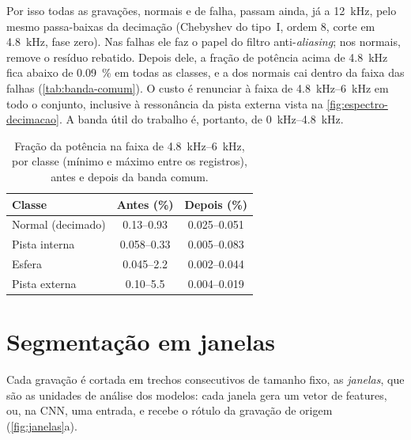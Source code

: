 Por isso todas as gravações, normais e de falha, passam ainda, já a
\SI{12}{\kilo\hertz}, pelo mesmo passa-baixas da decimação (Chebyshev do tipo~I,
ordem 8, corte em \SI{4.8}{\kilo\hertz}, fase zero). Nas falhas ele faz o papel
do filtro anti-\emph{aliasing}; nos normais, remove o resíduo rebatido. Depois
dele, a fração de potência acima de \SI{4.8}{\kilo\hertz} fica abaixo de
\SI{0.09}{\percent} em todas as classes, e a dos normais cai dentro da faixa das
falhas (\autoref{tab:banda-comum}). O custo é renunciar à faixa de
\SIrange{4.8}{6}{\kilo\hertz} em todo o conjunto, inclusive à ressonância da
pista externa vista na \autoref{fig:espectro-decimacao}. A banda útil do
trabalho é, portanto, de \SIrange{0}{4.8}{\kilo\hertz}.

\begin{table}[htb]
  \centering
  \caption{Fração da potência na faixa de \SIrange{4.8}{6}{\kilo\hertz}, por
  classe (mínimo e máximo entre os registros), antes e depois da banda comum.}
  \label{tab:banda-comum}
  \begin{tabular}{lcc}
    \toprule
    \textbf{Classe} & \textbf{Antes (\%)} & \textbf{Depois (\%)} \\
    \midrule
    Normal (decimado) & \numrange{0.13}{0.93} & \numrange{0.025}{0.051} \\
    Pista interna     & \numrange{0.058}{0.33} & \numrange{0.005}{0.083} \\
    Esfera            & \numrange{0.045}{2.2}  & \numrange{0.002}{0.044} \\
    Pista externa     & \numrange{0.10}{5.5}   & \numrange{0.004}{0.019} \\
    \bottomrule
  \end{tabular}
\end{table}

\section{Segmentação em janelas}
\label{sec:janelas}

Cada gravação é cortada em trechos consecutivos de tamanho fixo, as
\emph{janelas}, que são as unidades de análise dos modelos: cada janela gera um
vetor de features, ou, na CNN, uma entrada, e recebe o rótulo da gravação de
origem (\autoref{fig:janelas}a).

